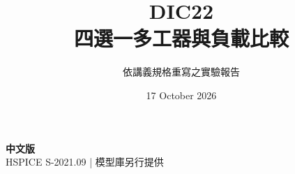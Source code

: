 \documentclass[11pt,a4paper]{article}
\title{\color{accent}DIC22\\[4pt]四選一多工器與負載比較}
\author{依講義規格重寫之實驗報告}
\date{17 October 2026}
\begin{document}
\maketitle
\begin{center}\small\textbf{中文版}\\
HSPICE S-2021.09 \quad | \quad 模型庫另行提供
\end{center}


\end{document}
